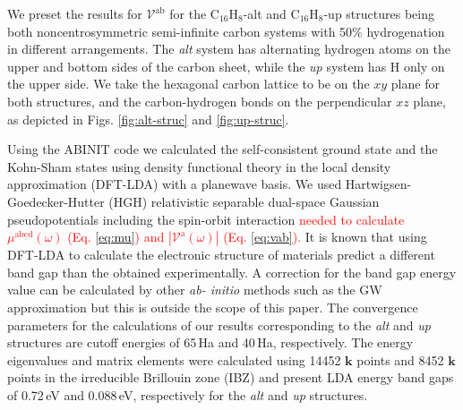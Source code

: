 \documentclass[prb,11pt,tightenlines,twocolumn,aps]{revtex4-1}
\begin{document}
We preset the results for $\mathcal{V}^{\mathrm{ab}}$ for the
C$_{16}$H$_{8}$-alt and C$_{16}$H$_{8}$-up structures being both
noncentrosymmetric semi-infinite carbon systems with 50\% hydrogenation in
different arrangements. The \emph{alt} system has alternating hydrogen atoms on
the upper and bottom sides of the carbon sheet, while the \emph{up} system has H
only on the upper side. We take the hexagonal carbon lattice to be on the $xy$
plane for both structures, and the carbon-hydrogen bonds on the perpendicular
$xz$ plane, as depicted in Figs.
\ref{fig:alt-struc} and \ref{fig:up-struc}.

Using the ABINIT code \cite{gonzeCPC09} we calculated the self-consistent ground
state and the Kohn-Sham states using density functional theory in the local
density approximation (DFT-LDA) with a planewave basis. We used Hartwigsen-
Goedecker-Hutter (HGH) relativistic separable dual-space Gaussian
pseudopotentials \cite{hartwigsenPRB98} including the spin-orbit interaction
\textcolor{red}{ needed to calculate $\mu^{\mathrm{abcd}}(\omega)$ (Eq.
\eqref{eq:mu}) and $|\mathcal{V}^{\mathrm{a}}(\omega)|$ (Eq. \eqref{eq:vab}).}
%
{\color{red} 
It is known that using DFT-LDA to calculate the electronic structure of
materials predict a different band gap than the obtained experimentally. A
correction for the band gap energy value can be calculated by other \emph{ab-
initio} methods such as the GW approximation \cite{onidaRMP02} but this is
outside the scope of this paper.
} %
% 
The convergence parameters for the calculations of our results corresponding to
the \emph{alt} and \emph{up} structures are cutoff energies of 65\,Ha and
40\,Ha, respectively. The energy eigenvalues and matrix elements were calculated
using 14452 $\mathbf{k}$ points and 8452 $\mathbf{k}$ points in the irreducible
Brillouin zone (IBZ) and present LDA energy band gaps of 0.72\,eV and 0.088\,eV,
respectively for the \emph{alt} and \emph{up} structures. 


\end{document}
